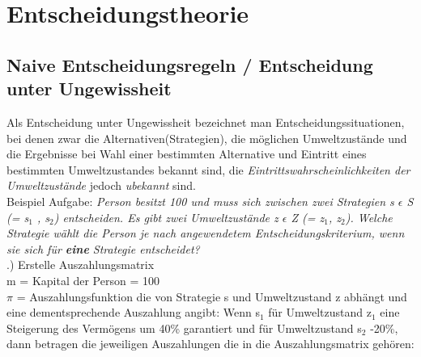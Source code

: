 \documentclass[11pt]{article}
\date{\today}
\title{}
\begin{document}
\tableofcontents


\section{Entscheidungstheorie}
\label{sec:orge5d4a7d}
\subsection{Naive Entscheidungsregeln / Entscheidung unter Ungewissheit}
\label{sec:org31eef64}
Als Entscheidung unter Ungewissheit bezeichnet man Entscheidungssituationen, bei denen zwar die Alternativen(Strategien), die möglichen Umweltzustände und die Ergebnisse bei Wahl einer bestimmten Alternative und Eintritt eines bestimmten Umweltzustandes bekannt sind, die \emph{Eintrittswahrscheinlichkeiten der Umweltzustände} jedoch \emph{ubekannt} sind.\\
Beispiel Aufgabe: \emph{Person besitzt 100\texteuro{} und muss sich zwischen zwei Strategien s \(\epsilon\) S (= s\(_{\text{1}}\) , s\(_{\text{2}}\)) entscheiden. Es gibt zwei Umweltzustände z \(\epsilon\) Z (= z\(_{\text{1}}\), z\(_{\text{2}}\)). Welche Strategie wählt die Person je nach angewendetem Entscheidungskriterium, wenn sie sich für \textbf{eine} Strategie entscheidet?}\\
.) Erstelle Auszahlungsmatrix\\
m = Kapital der Person = 100\texteuro{}\\
\(\pi\) = Auszahlungsfunktion die von Strategie s und Umweltzustand z abhängt und eine dementsprechende Auszahlung angibt: Wenn s\(_{\text{1}}\) für Umweltzustand z\(_{\text{1}}\) eine Steigerung des Vermögens um 40\% garantiert und für Umweltzustand s\(_{\text{2}}\) -20\%, dann betragen die jeweiligen Auszahlungen die in die Auszahlungsmatrix gehören:
\end{document}
